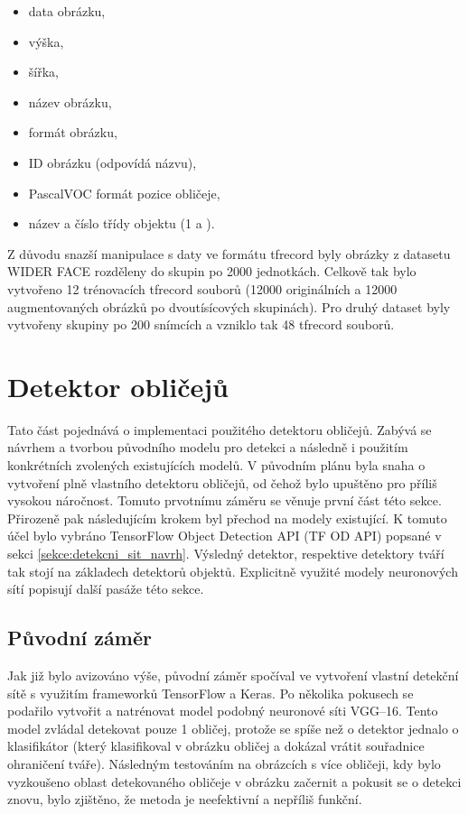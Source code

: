 \begin{itemize}
  \item data obrázku,
  \item výška,
  \item šířka,
  \item název obrázku,
  \item formát obrázku,
  \item ID obrázku (odpovídá názvu),
  \item PascalVOC formát pozice obličeje,
  \item název a číslo třídy objektu (1 a ).
\end{itemize}

Z důvodu snazší manipulace s daty ve formátu tfrecord byly obrázky z datasetu WIDER FACE rozděleny do skupin po 2000 jednotkách. Celkově tak bylo vytvořeno 12 trénovacích tfrecord souborů (12000 originálních a 12000 augmentovaných obrázků po dvoutísícových skupinách). Pro druhý dataset byly vytvořeny skupiny po 200 snímcích a vzniklo tak 48 tfrecord souborů.

\section{Detektor obličejů}
\label{sekce:detektor_obliceju_implementace}
Tato část pojednává o implementaci použitého detektoru obličejů. Zabývá se návrhem a tvorbou původního modelu pro detekci a následně i použitím konkrétních zvolených existujících modelů. V původním plánu byla snaha o vytvoření plně vlastního detektoru obličejů, od čehož bylo upuštěno pro příliš vysokou náročnost. Tomuto prvotnímu záměru se věnuje první část této sekce. Přirozeně pak následujícím krokem byl přechod na modely existující. K tomuto účel bylo vybráno TensorFlow Object Detection API (TF OD API) popsané v sekci \ref{sekce:detekcni_sit_navrh}. Výsledný detektor, respektive detektory tváří tak stojí na základech detektorů objektů. Explicitně využité modely neuronových sítí popisují další pasáže této sekce.

\subsection*{Původní záměr}
Jak již bylo avizováno výše, původní záměr spočíval ve vytvoření vlastní detekční sítě s využitím frameworků TensorFlow a Keras. Po několika pokusech se podařilo vytvořit a natrénovat model podobný neuronové síti VGG--16. Tento model zvládal detekovat pouze 1 obličej, protože se spíše než o detektor jednalo o klasifikátor (který klasifikoval v obrázku obličej a dokázal vrátit souřadnice ohraničení tváře). Následným testováním na obrázcích s více obličeji, kdy bylo vyzkoušeno oblast detekovaného obličeje v obrázku začernit a pokusit se o detekci znovu, bylo zjištěno, že metoda je neefektivní a nepříliš funkční.

